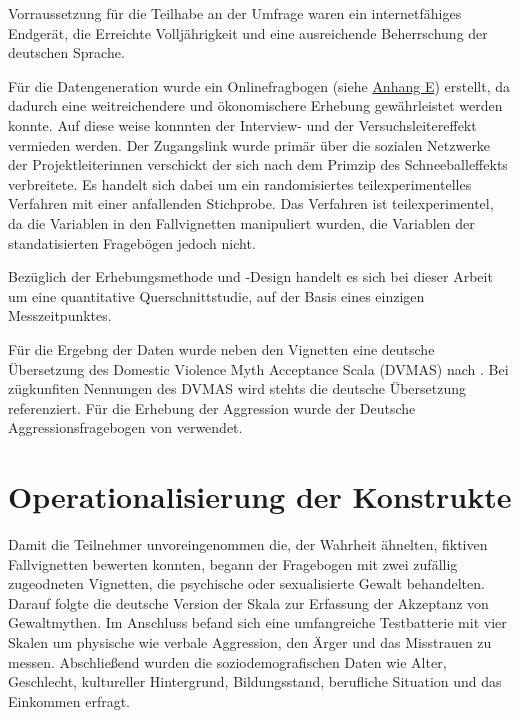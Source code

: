 Vorraussetzung für die Teilhabe an der Umfrage waren ein internetfähiges Endgerät, die Erreichte Volljährigkeit und eine ausreichende Beherrschung der deutschen Sprache. 

Für die Datengeneration wurde ein Onlinefragbogen (siehe \hyperref[Fragebogen]{Anhang E}) erstellt, da dadurch eine weitreichendere und ökonomischere Erhebung gewährleistet werden konnte. Auf diese weise konnnten der Interview- und der Versuchsleitereffekt vermieden werden. Der Zugangslink wurde primär über die sozialen Netzwerke der Projektleiterinnen verschickt der sich nach dem Primzip des Schneeballeffekts verbreitete. Es handelt sich dabei um ein randomisiertes teilexperimentelles Verfahren mit einer anfallenden Stichprobe. Das Verfahren ist teilexperimentel, da die Variablen in den Fallvignetten manipuliert wurden, die Variablen der standatisierten Fragebögen jedoch nicht.

Bezüglich der Erhebungsmethode und -Design handelt es sich bei dieser Arbeit um eine quantitative Querschnittstudie, auf der Basis eines einzigen Messzeitpunktes.

Für die Ergebng der Daten wurde neben den Vignetten eine deutsche Übersetzung des Domestic Violence Myth Acceptance Scala (DVMAS) nach \textcite{Peters2003}. Bei zügkunfiten Nennungen des DVMAS wird stehts die deutsche Übersetzung referenziert. Für die Erhebung der Aggression wurde der Deutsche Aggressionsfragebogen von \textcite{Aggressionsfragebogen} verwendet.


\section{Operationalisierung der Konstrukte}    \label{sec_3.3}
Damit die Teilnehmer unvoreingenommen die, der Wahrheit ähnelten, fiktiven Fallvignetten bewerten konnten, begann der Fragebogen mit zwei zufällig zugeodneten Vignetten, die psychische oder sexualisierte Gewalt behandelten. Darauf folgte die deutsche Version der Skala zur Erfassung der Akzeptanz von Gewaltmythen. Im Anschluss befand sich eine umfangreiche Testbatterie mit vier Skalen um physische wie verbale Aggression, den Ärger und das Misstrauen zu messen. Abschließend wurden die soziodemografischen Daten wie Alter, Geschlecht, kultureller Hintergrund, Bildungsstand, berufliche Situation und das Einkommen erfragt.

